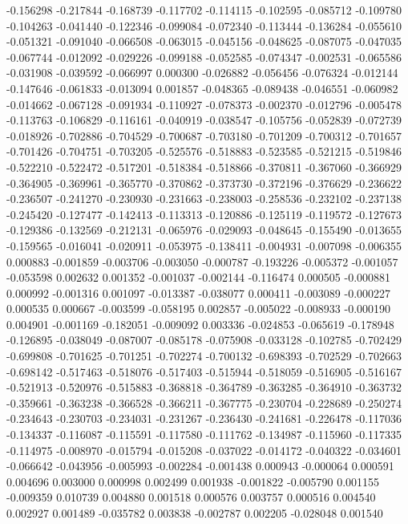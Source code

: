 -0.156298
-0.217844
-0.168739
-0.117702
-0.114115
-0.102595
-0.085712
-0.109780
-0.104263
-0.041440
-0.122346
-0.099084
-0.072340
-0.113444
-0.136284
-0.055610
-0.051321
-0.091040
-0.066508
-0.063015
-0.045156
-0.048625
-0.087075
-0.047035
-0.067744
-0.012092
-0.029226
-0.099188
-0.052585
-0.074347
-0.002531
-0.065586
-0.031908
-0.039592
-0.066997
0.000300
-0.026882
-0.056456
-0.076324
-0.012144
-0.147646
-0.061833
-0.013094
0.001857
-0.048365
-0.089438
-0.046551
-0.060982
-0.014662
-0.067128
-0.091934
-0.110927
-0.078373
-0.002370
-0.012796
-0.005478
-0.113763
-0.106829
-0.116161
-0.040919
-0.038547
-0.105756
-0.052839
-0.072739
-0.018926
-0.702886
-0.704529
-0.700687
-0.703180
-0.701209
-0.700312
-0.701657
-0.701426
-0.704751
-0.703205
-0.525576
-0.518883
-0.523585
-0.521215
-0.519846
-0.522210
-0.522472
-0.517201
-0.518384
-0.518866
-0.370811
-0.367060
-0.366929
-0.364905
-0.369961
-0.365770
-0.370862
-0.373730
-0.372196
-0.376629
-0.236622
-0.236507
-0.241270
-0.230930
-0.231663
-0.238003
-0.258536
-0.232102
-0.237138
-0.245420
-0.127477
-0.142413
-0.113313
-0.120886
-0.125119
-0.119572
-0.127673
-0.129386
-0.132569
-0.212131
-0.065976
-0.029093
-0.048645
-0.155490
-0.013655
-0.159565
-0.016041
-0.020911
-0.053975
-0.138411
-0.004931
-0.007098
-0.006355
0.000883
-0.001859
-0.003706
-0.003050
-0.000787
-0.193226
-0.005372
-0.001057
-0.053598
0.002632
0.001352
-0.001037
-0.002144
-0.116474
0.000505
-0.000881
0.000992
-0.001316
0.001097
-0.013387
-0.038077
0.000411
-0.003089
-0.000227
0.000535
0.000667
-0.003599
-0.058195
0.002857
-0.005022
-0.008933
-0.000190
0.004901
-0.001169
-0.182051
-0.009092
0.003336
-0.024853
-0.065619
-0.178948
-0.126895
-0.038049
-0.087007
-0.085178
-0.075908
-0.033128
-0.102785
-0.702429
-0.699808
-0.701625
-0.701251
-0.702274
-0.700132
-0.698393
-0.702529
-0.702663
-0.698142
-0.517463
-0.518076
-0.517403
-0.515944
-0.518059
-0.516905
-0.516167
-0.521913
-0.520976
-0.515883
-0.368818
-0.364789
-0.363285
-0.364910
-0.363732
-0.359661
-0.363238
-0.366528
-0.366211
-0.367775
-0.230704
-0.228689
-0.250274
-0.234643
-0.230703
-0.234031
-0.231267
-0.236430
-0.241681
-0.226478
-0.117036
-0.134337
-0.116087
-0.115591
-0.117580
-0.111762
-0.134987
-0.115960
-0.117335
-0.114975
-0.008970
-0.015794
-0.015208
-0.037022
-0.014172
-0.040322
-0.034601
-0.066642
-0.043956
-0.005993
-0.002284
-0.001438
0.000943
-0.000064
0.000591
0.004696
0.003000
0.000998
0.002499
0.001938
-0.001822
-0.005790
0.001155
-0.009359
0.010739
0.004880
0.001518
0.000576
0.003757
0.000516
0.004540
0.002927
0.001489
-0.035782
0.003838
-0.002787
0.002205
-0.028048
0.001540
